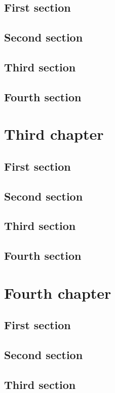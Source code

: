 \documentclass{researchbook}
\begin{document}
\section{First section}\lipsum
\section{Second section}\lipsum
\section{Third section}\lipsum
\section{Fourth section}\lipsum


\chapter{Third chapter}

\section{First section}\lipsum
\section{Second section}\lipsum
\section{Third section}\lipsum
\section{Fourth section}\lipsum


\chapter{Fourth chapter}

\section{First section}\lipsum
\section{Second section}\lipsum
\section{Third section}\lipsum
\end{document}
